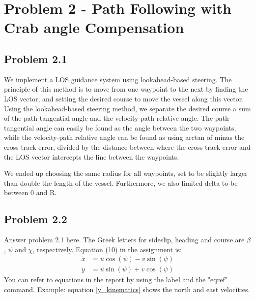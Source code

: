 \section*{Problem 2 - Path Following with Crab angle Compensation}
\subsection*{Problem 2.1}
We implement a LOS guidance system using lookahead-based steering. The principle of this method is to move from one waypoint to the next by finding the LOS vector, and setting the desired course to move the vessel along this vector. Using the lookahead-based steering method, we separate the desired course a sum of the path-tangential angle and the velocity-path relative angle. The path-tangential angle can easily be found as the angle between the two waypoints, while the velocity-path relative angle can be found as using arctan of minus the cross-track error, divided by the distance between where the cross-track error and the LOS vector intercepts the line between the waypoints. 

We ended up choosing the same radius for all waypoints, set to be slightly larger than double the length of the vessel. Furthermore, we also limited delta to be between 0 and R. 

\subsection{Problem 2.2}



Answer problem 2.1 here. The Greek letters for sideslip, heading and course are $\beta$, $\psi$ and $\chi$, respectively. Equation (10) in the assignment is:
\begin{equation}
\label{y_kinematics}
	\begin{aligned}
		\dot{x} &= u \cos (\psi) -v \sin (\psi) \\
		\dot{y} &= u \sin (\psi) + v \cos (\psi)
	\end{aligned}
\end{equation} 
You can refer to equations in the report by using the label and the "eqref" command. Example: equation \eqref{y_kinematics} shows the north and east velocities. 

